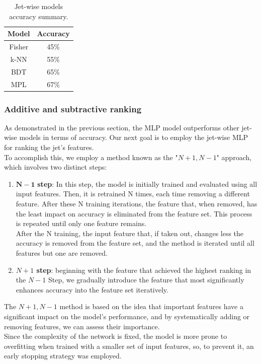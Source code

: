 \begin{table}[H]
    \centering
    \begin{tabular}{c|c}
    \toprule
        \textbf{Model} & \textbf{Accuracy} \\
        \midrule
        Fisher & 45\%\\
        k-NN & 55\%\\
        BDT  & 65\%\\
        MPL  & 67\%\\
    \end{tabular}
    \caption{Jet-wise models accuracy summary.}
    \label{tab:jet_wise_summary}
\end{table}
\subsubsection*{Additive and subtractive ranking}
As demonstrated in the previous section, the MLP model outperforms other jet-wise models in terms of accuracy.
Our next goal is to employ the jet-wise MLP for ranking the jet's features.\\
To accomplish this, we employ a method known as the "$N+1, N-1$" approach, which involves two distinct steps:
\begin{enumerate}
    \item $\bm{N-1}$ \textbf{step}: In this step, the model is initially trained and evaluated using all input features. Then, it is retrained N times, each time removing a different feature. After these N training iterations, the feature that, when removed, has the least impact on accuracy is eliminated from the feature set. This process is repeated until only one feature remains.\\
    After the N training, the input feature that, if taken out, changes less the accuracy is removed from the feature set, and the method is iterated until all features but one are removed.
    \item \textbf{$N+1$ step}: beginning with the feature that achieved the highest ranking in the $N-1$ Step, we gradually introduce the feature that most significantly enhances accuracy into the feature set iteratively.
\end{enumerate}
The $N+1,N-1$ method is based on the idea that important features have a significant impact on the model's performance, and by systematically adding or removing features, we can assess their importance.\\
Since the complexity of the network is fixed, the model is more prone to overfitting when trained with a smaller set of input features, so, to prevent it, an early stopping strategy was employed.


